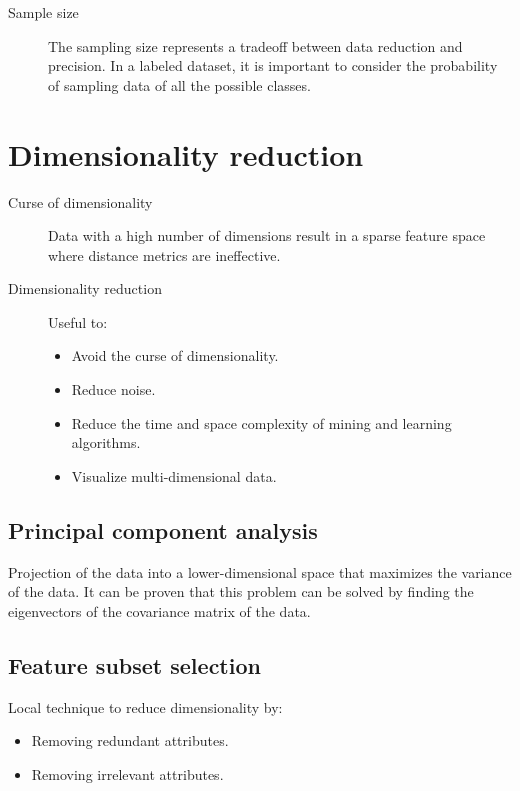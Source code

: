 \begin{description}
    \item[Sample size]
        The sampling size represents a tradeoff between data reduction and precision.
        In a labeled dataset, it is important to consider the probability of sampling data of all the possible classes.
\end{description}



\section{Dimensionality reduction}

\begin{description}
    \item[Curse of dimensionality] 
        Data with a high number of dimensions result in a sparse feature space
        where distance metrics are ineffective. 

    \item[Dimensionality reduction] 
        Useful to:
        \begin{itemize}
            \item Avoid the curse of dimensionality.
            \item Reduce noise.
            \item Reduce the time and space complexity of mining and learning algorithms.
            \item Visualize multi-dimensional data.
        \end{itemize}
\end{description}

\subsection{Principal component analysis}  
Projection of the data into a lower-dimensional space that maximizes the variance of the data.
It can be proven that this problem can be solved by finding the eigenvectors of the covariance matrix of the data.

\subsection{Feature subset selection}  
    Local technique to reduce dimensionality by:
    \begin{itemize}
        \item Removing redundant attributes.
        \item Removing irrelevant attributes.
    \end{itemize}


